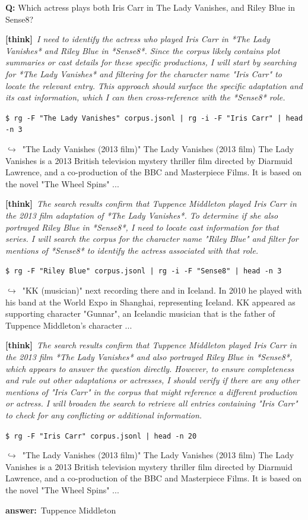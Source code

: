 \documentclass{llmxive}
\providecommand{\thk}[1]{{\footnotesize\textbf{[think]}\ \textit{#1}\par}}
\providecommand{\cmd}[1]{{\footnotesize\texttt{\$\ #1}\par}}
\providecommand{\retr}[1]{{\footnotesize\quad$\hookrightarrow$\ #1\par}}
\providecommand{\ans}[1]{{\footnotesize\textbf{answer:}\ #1\par}}
\begin{document}
\begin{sftbox}[label={ex:sft-actress},title={\textsc{two-role bridge (3 hops)}}]
\textbf{Q:} Which actress plays both Iris Carr in The Lady Vanishes, and Riley Blue in Sense8?\\[1pt]
  \thk{I need to identify the actress who played Iris Carr in *The Lady Vanishes* and Riley Blue in *Sense8*. Since the corpus likely contains plot summaries or cast details for these specific productions, I will start by searching for *The Lady Vanishes* and filtering for the character name "Iris Carr" to locate the relevant entry. This approach should surface the specific adaptation and its cast information, which I can then cross-reference with the *Sense8* role.}
  \cmd{rg -F "The Lady Vanishes" corpus.jsonl | rg -i -F "Iris Carr" | head -n 3}
  \retr{"The Lady Vanishes (2013 film)" The Lady Vanishes (2013 film) The Lady Vanishes is a 2013 British television mystery thriller film directed by Diarmuid Lawrence, and a co-production of the BBC and Masterpiece Films. It is based on the novel "The Wheel Spins" ...}
  \thk{The search results confirm that Tuppence Middleton played Iris Carr in the 2013 film adaptation of *The Lady Vanishes*. To determine if she also portrayed Riley Blue in *Sense8*, I need to locate cast information for that series. I will search the corpus for the character name "Riley Blue" and filter for mentions of *Sense8* to identify the actress associated with that role.}
  \cmd{rg -F "Riley Blue" corpus.jsonl | rg -i -F "Sense8" | head -n 3}
  \retr{"KK (musician)" next recording there and in Iceland. In 2010 he played with his band at the World Expo in Shanghai, representing Iceland. KK appeared as supporting character "Gunnar", an Icelandic musician that is the father of Tuppence Middleton's character ...}
  \thk{The search results confirm that Tuppence Middleton played Iris Carr in the 2013 film *The Lady Vanishes* and also portrayed Riley Blue in *Sense8*, which appears to answer the question directly. However, to ensure completeness and rule out other adaptations or actresses, I should verify if there are any other mentions of "Iris Carr" in the corpus that might reference a different production or actress. I will broaden the search to retrieve all entries containing "Iris Carr" to check for any conflicting or additional information.}
  \cmd{rg -F "Iris Carr" corpus.jsonl | head -n 20}
  \retr{"The Lady Vanishes (2013 film)" The Lady Vanishes (2013 film) The Lady Vanishes is a 2013 British television mystery thriller film directed by Diarmuid Lawrence, and a co-production of the BBC and Masterpiece Films. It is based on the novel "The Wheel Spins" ...}
  \ans{Tuppence Middleton}
\end{sftbox}\medskip
\end{document}
